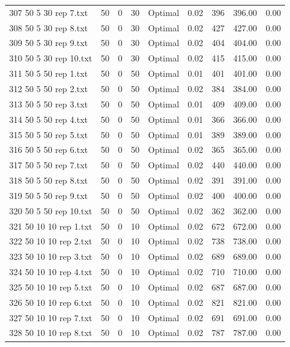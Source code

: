 \begin{longtable}{lrrllrrrr}
307 50 5 30 rep 7.txt & 50 & 0 & 30 & Optimal &  0.02 & 396 & 396.00 &  0.00\\
308 50 5 30 rep 8.txt & 50 & 0 & 30 & Optimal &  0.02 & 427 & 427.00 &  0.00\\
309 50 5 30 rep 9.txt & 50 & 0 & 30 & Optimal &  0.02 & 404 & 404.00 &  0.00\\
310 50 5 30 rep 10.txt & 50 & 0 & 30 & Optimal &  0.02 & 415 & 415.00 &  0.00\\
311 50 5 50 rep 1.txt & 50 & 0 & 50 & Optimal &  0.01 & 401 & 401.00 &  0.00\\
312 50 5 50 rep 2.txt & 50 & 0 & 50 & Optimal &  0.02 & 384 & 384.00 &  0.00\\
313 50 5 50 rep 3.txt & 50 & 0 & 50 & Optimal &  0.01 & 409 & 409.00 &  0.00\\
314 50 5 50 rep 4.txt & 50 & 0 & 50 & Optimal &  0.01 & 366 & 366.00 &  0.00\\
315 50 5 50 rep 5.txt & 50 & 0 & 50 & Optimal &  0.01 & 389 & 389.00 &  0.00\\
316 50 5 50 rep 6.txt & 50 & 0 & 50 & Optimal &  0.02 & 365 & 365.00 &  0.00\\
317 50 5 50 rep 7.txt & 50 & 0 & 50 & Optimal &  0.02 & 440 & 440.00 &  0.00\\
318 50 5 50 rep 8.txt & 50 & 0 & 50 & Optimal &  0.02 & 391 & 391.00 &  0.00\\
319 50 5 50 rep 9.txt & 50 & 0 & 50 & Optimal &  0.02 & 400 & 400.00 &  0.00\\
320 50 5 50 rep 10.txt & 50 & 0 & 50 & Optimal &  0.02 & 362 & 362.00 &  0.00\\
321 50 10 10 rep 1.txt & 50 & 0 & 10 & Optimal &  0.02 & 672 & 672.00 &  0.00\\
322 50 10 10 rep 2.txt & 50 & 0 & 10 & Optimal &  0.02 & 738 & 738.00 &  0.00\\
323 50 10 10 rep 3.txt & 50 & 0 & 10 & Optimal &  0.02 & 689 & 689.00 &  0.00\\
324 50 10 10 rep 4.txt & 50 & 0 & 10 & Optimal &  0.02 & 710 & 710.00 &  0.00\\
325 50 10 10 rep 5.txt & 50 & 0 & 10 & Optimal &  0.02 & 687 & 687.00 &  0.00\\
326 50 10 10 rep 6.txt & 50 & 0 & 10 & Optimal &  0.02 & 821 & 821.00 &  0.00\\
327 50 10 10 rep 7.txt & 50 & 0 & 10 & Optimal &  0.02 & 691 & 691.00 &  0.00\\
328 50 10 10 rep 8.txt & 50 & 0 & 10 & Optimal &  0.02 & 787 & 787.00 &  0.00\\

\end{longtable}
